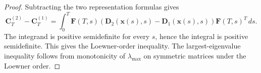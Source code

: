 \documentclass[10pt,a4paper]{amsart}
\newcommand{\bC}{\mathbf{C}}
\newcommand{\bD}{\mathbf{D}}
\newcommand{\bF}{\mathbf{F}}
\newcommand{\bx}{\mathbf{x}}
\newcommand{\lmax}{\lambda_{\max}}
\begin{document}
\begin{proof}
Subtracting the two representation formulas gives
\[
    \bC_T^{(2)}-\bC_T^{(1)}
    =
    \int_0^T
    \bF(T,s)\left(\bD_2(\bx(s),s)-\bD_1(\bx(s),s)\right)\bF(T,s)^T\,ds .
\]
The integrand is positive semidefinite for every \(s\), hence the integral is positive semidefinite.  This gives the Loewner-order inequality.  The largest-eigenvalue inequality follows from monotonicity of \(\lmax\) on symmetric matrices under the Loewner order.
\end{proof}
\end{document}
